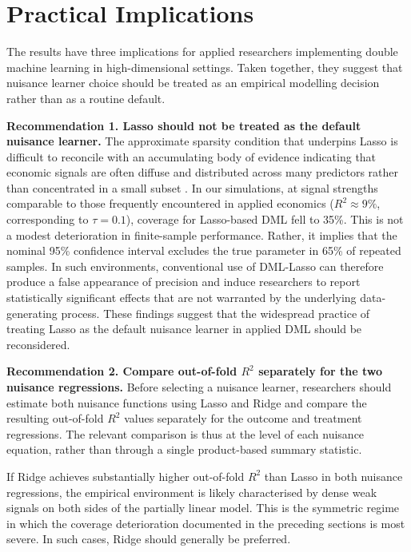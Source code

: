 \documentclass[a4paper,10.5pt]{article}
\begin{document}
\section{Practical Implications}\label{sec:implications}

The results have three implications for applied researchers implementing double machine learning in high-dimensional settings. Taken together, they suggest that nuisance learner choice should be treated as an empirical modelling decision rather than as a routine default.

\medskip
\noindent\textbf{Recommendation 1. Lasso should not be treated as the default nuisance learner.}
The approximate sparsity condition that underpins Lasso is difficult to reconcile with an accumulating body of evidence indicating that economic signals are often diffuse and distributed across many predictors rather than concentrated in a small subset \citep{giannone2021, gu2020}. In our simulations, at signal strengths comparable to those frequently encountered in applied economics ($R^2 \approx 9\%$, corresponding to $\tau = 0.1$), coverage for Lasso-based DML fell to 35\%. This is not a modest deterioration in finite-sample performance. Rather, it implies that the nominal 95\% confidence interval excludes the true parameter in 65\% of repeated samples. In such environments, conventional use of DML-Lasso can therefore produce a false appearance of precision and induce researchers to report statistically significant effects that are not warranted by the underlying data-generating process. These findings suggest that the widespread practice of treating Lasso as the default nuisance learner in applied DML should be reconsidered.

\medskip
\noindent\textbf{Recommendation 2. Compare out-of-fold $R^2$ separately for the two nuisance regressions.}
Before selecting a nuisance learner, researchers should estimate both nuisance functions using Lasso and Ridge and compare the resulting out-of-fold $R^2$ values separately for the outcome and treatment regressions. The relevant comparison is thus at the level of each nuisance equation, rather than through a single product-based summary statistic.

If Ridge achieves substantially higher out-of-fold $R^2$ than Lasso in both nuisance regressions, the empirical environment is likely characterised by dense weak signals on both sides of the partially linear model. This is the symmetric regime in which the coverage deterioration documented in the preceding sections is most severe. In such cases, Ridge should generally be preferred.
\end{document}
